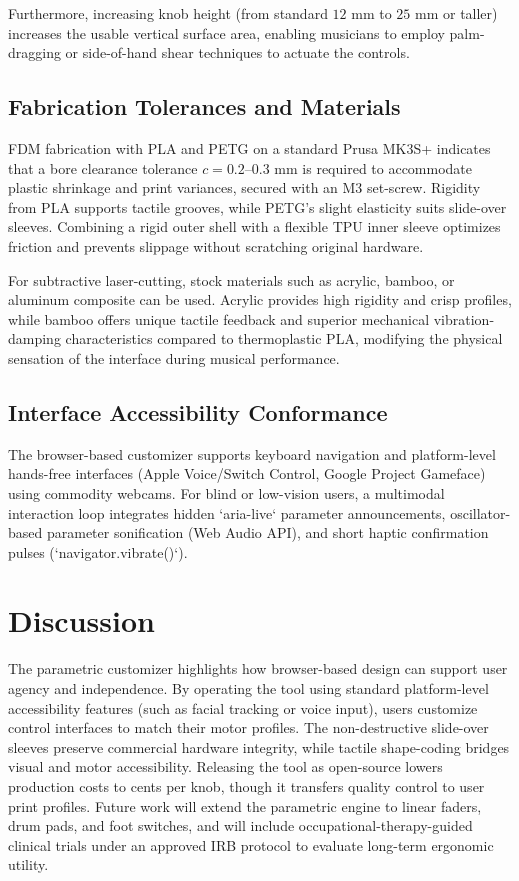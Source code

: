 \documentclass[manuscript,screen,review,anonymous]{acmart}
\begin{document}
Furthermore, increasing knob height (from standard $12\text{ mm}$ to $25\text{ mm}$ or taller) increases the usable vertical surface area, enabling musicians to employ palm-dragging or side-of-hand shear techniques to actuate the controls.

\subsection{Fabrication Tolerances and Materials}
FDM fabrication with PLA and PETG on a standard Prusa MK3S+ indicates that a bore clearance tolerance $c = 0.2\text{--}0.3\text{ mm}$ is required to accommodate plastic shrinkage and print variances, secured with an M3 set-screw. Rigidity from PLA supports tactile grooves, while PETG's slight elasticity suits slide-over sleeves. Combining a rigid outer shell with a flexible TPU inner sleeve optimizes friction and prevents slippage without scratching original hardware.

For subtractive laser-cutting, stock materials such as acrylic, bamboo, or aluminum composite can be used. Acrylic provides high rigidity and crisp profiles, while bamboo offers unique tactile feedback and superior mechanical vibration-damping characteristics compared to thermoplastic PLA, modifying the physical sensation of the interface during musical performance.

\subsection{Interface Accessibility Conformance}
The browser-based customizer supports keyboard navigation and platform-level hands-free interfaces (Apple Voice/Switch Control, Google Project Gameface) using commodity webcams. For blind or low-vision users, a multimodal interaction loop integrates hidden `aria-live` parameter announcements, oscillator-based parameter sonification (Web Audio API), and short haptic confirmation pulses (`navigator.vibrate()`).

\section{Discussion}

The parametric customizer highlights how browser-based design can support user agency and independence. By operating the tool using standard platform-level accessibility features (such as facial tracking or voice input), users customize control interfaces to match their motor profiles. The non-destructive slide-over sleeves preserve commercial hardware integrity, while tactile shape-coding bridges visual and motor accessibility. Releasing the tool as open-source lowers production costs to cents per knob, though it transfers quality control to user print profiles. Future work will extend the parametric engine to linear faders, drum pads, and foot switches, and will include occupational-therapy-guided clinical trials under an approved IRB protocol to evaluate long-term ergonomic utility.
\end{document}
